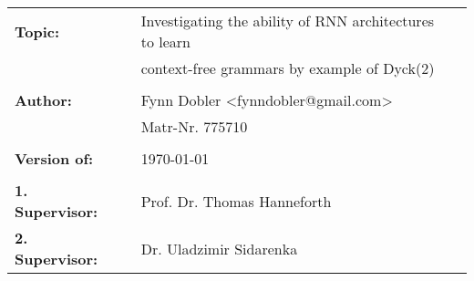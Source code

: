 \begin{flushleft}
\begin{tabular}{llll}
\textbf{Topic:} & & Investigating the ability of RNN architectures to learn & \\
& & context-free grammars by example of Dyck(2) & \\
& & \\
\textbf{Author:} & & Fynn Dobler <fynndobler@gmail.com>& \\
& & Matr-Nr. 775710 & \\
& & \\
\textbf{Version of:} & & \today &\\
& & \\
\textbf{1. Supervisor:} & & Prof. Dr. Thomas Hanneforth &\\
\textbf{2. Supervisor:} & & Dr. Uladzimir Sidarenka &\\
\end{tabular}
\end{flushleft}
